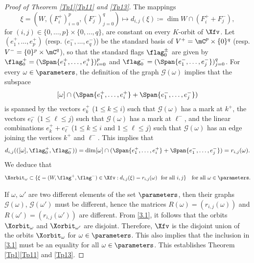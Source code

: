 \begin{proof}[Proof of Theorem \ref{Tp1}\ref{Tp11} and \ref{Tp13}]
The mappings
\[\xi=(W,(F^+_i)_{i=0}^p,(F^-_j)_{j=0}^q)\mapsto d_{i,j}(\xi)\coloneqq \dim W\cap (F_i^++F_j^-),\] for $(i,j)\in\{0,\ldots,p\}\times\{0,\ldots,q\}$, are constant on every $K$-orbit of $\Xfv$.
Let $(e_1^+,\ldots,e_p^+)$ (resp. $(e_1^-,\ldots,e_q^-$)) be the standard basis of $V^+=\mC^p\times\{0\}^q$ (resp. $V^-=\{0\}^p\times\mC^q$), so that the standard flags $\flag_0^\pm$ are given by $\flag_0^+=(\Span{e_1^+,\ldots,e_i^+})_{i=0}^p$ and $\flag_0^-=(\Span{e_1^-,\ldots,e_j^-})_{j=0}^q$.
For every $\omega\in\parameters$,
the definition of the graph $\mathcal{G}(\omega)$ implies that the subspace \[[\omega]\cap(\Span{e_1^+,\ldots,e_i^+}+\Span{e_1^-,\ldots,e_j^-})\]
is spanned by the vectors $e_k^+$ ($1\leq k\leq i$) such that $\mathcal{G}(\omega)$ has a mark at $k^+$, the vectors $e_\ell^-$ ($1\leq \ell\leq j$) such that $\mathcal{G}(\omega)$ has a mark at $\ell^-$, and the linear combinations $e_k^++e_\ell^-$ ($1\leq k\leq i$ and $1\leq \ell\leq j$) such that $\mathcal{G}(\omega)$ has an edge joining the vertices $k^+$ and $\ell^-$. This implies that
\[
d_{i,j}(([\omega],\flag_0^+,\flag_0^-))=\dim [\omega]\cap(\Span{e_1^+,\ldots,e_i^+}+\Span{e_1^-,\ldots,e_j^-})=r_{i,j}(\omega).
\]
We deduce that
\begin{equation}
\label{3.1}
\Xorbit_\omega\subset \{\xi=(W,\flag^+,\flag^-)\in\Xfv: d_{i,j}(\xi)=r_{i,j}(\omega)\ \ \mbox{for all $i,j$}\}\quad\mbox{for all $\omega\in\parameters$}.
\end{equation}

If $\omega$, $\omega'$ are two different elements of the set $\parameters$, then their graphs $\mathcal{G}(\omega)$, $\mathcal{G}(\omega')$ must be different, hence the matrices $R(\omega)=(r_{i,j}(\omega))$ and $R(\omega')=(r_{i,j}(\omega'))$ are different. From \eqref{3.1}, it follows that the orbits $\Xorbit_\omega$ and $\Xorbit_{\omega'}$ are disjoint.
Therefore, $\Xfv$ is the disjoint union of the orbits $\Xorbit_\omega$ for $\omega\in\parameters$. This also implies that the inclusion in \eqref{3.1} must be an equality for all $\omega\in\parameters$.
This establishes Theorem \ref{Tp1}\ref{Tp11} and \ref{Tp13}.
\end{proof}

